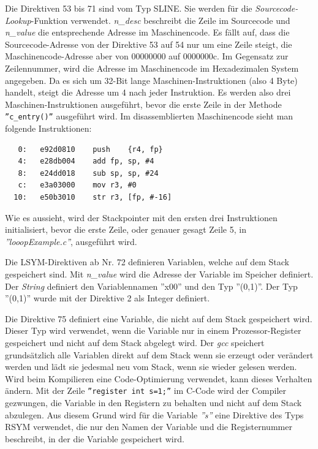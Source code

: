 Die Direktiven 53 bis 71 sind vom Typ SLINE.
Sie werden für die \textit{Sourcecode-Lookup}-Funktion verwendet.
\textit{n\_desc} beschreibt die Zeile im Sourcecode und \textit{n\_value} die entsprechende Adresse im Maschinencode.
Es fällt auf, dass die Sourcecode-Adresse von der Direktive 53 auf 54 nur um eine Zeile steigt, die Maschinencode-Adresse aber von 00000000 auf 0000000c.
Im Gegensatz zur Zeilennummer, wird die Adresse im Maschinencode im Hexadezimalen System angegeben.
Da es sich um 32-Bit lange Maschinen-Instruktionen (also 4 Byte) handelt, steigt die Adresse um 4 nach jeder Instruktion.
Es werden also drei Maschinen-Instruktionen ausgeführt, bevor die erste Zeile in der Methode \texttt{''c\_entry()''} ausgeführt wird.
Im disassemblierten Maschinencode sieht man folgende Instruktionen:
\lstset{language=plain}
\begin{lstlisting}
   0:	e92d0810 	push	{r4, fp}
   4:	e28db004 	add	fp, sp, #4
   8:	e24dd018 	sub	sp, sp, #24
   c:	e3a03000 	mov	r3, #0
  10:	e50b3010 	str	r3, [fp, #-16]
\end{lstlisting}

Wie es aussieht, wird der Stackpointer mit den ersten drei Instruktionen initialisiert, bevor die erste Zeile, oder genauer gesagt Zeile 5, in \textit{''looopExample.c''}, ausgeführt wird.

Die LSYM-Direktiven ab Nr. 72 definieren Variablen, welche auf dem Stack gespeichert sind.
Mit \textit{n\_value} wird die Adresse der Variable im Speicher definiert.
Der \textit{String} definiert den Variablennamen ''x00'' und den Typ ''(0,1)''.
Der Typ ''(0,1)'' wurde mit der Direktive 2 als Integer definiert.

Die Direktive 75 definiert eine Variable, die nicht auf dem Stack gespeichert wird.
Dieser Typ wird verwendet, wenn die Variable nur in einem Prozessor-Register gespeichert und nicht auf dem Stack abgelegt wird.
Der \textit{gcc} speichert grundsätzlich alle Variablen direkt auf dem Stack wenn sie erzeugt oder verändert werden und lädt sie jedesmal neu vom Stack, wenn sie wieder gelesen werden.
Wird beim Kompilieren eine Code-Optimierung verwendet, kann dieses Verhalten ändern.
Mit der Zeile \texttt{{''register int s=1;''}} im C-Code wird der Compiler gezwungen, die Variable in den Registern zu behalten und nicht auf dem Stack abzulegen.
Aus diesem Grund wird für die Variable \textit{''s''} eine Direktive des Typs RSYM verwendet, die nur den Namen der Variable und die Registernummer beschreibt, in der die Variable gespeichert wird.


